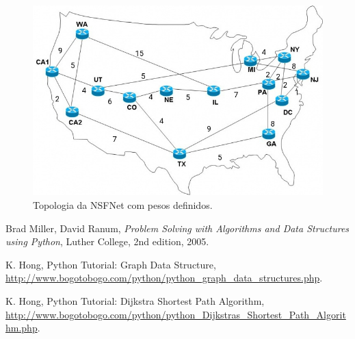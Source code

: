 \documentclass[a4paper,10pt]{article}
\begin{document}
  \begin{figure}[h!]
    \includegraphics[width=\linewidth]{nsfnet.jpg}
    \caption{Topologia da NSFNet com pesos definidos.}
    \label{fig:nsfnet}
  \end{figure}


\begin{thebibliography}{9}

  Brad Miller, David Ranum,
  \textit{Problem Solving with Algorithms and Data Structures using Python},
  Luther College,
  2nd edition,
  2005.
  
  K. Hong, Python Tutorial: Graph Data Structure,
  \url{http://www.bogotobogo.com/python/python_graph_data_structures.php}.
  
  K. Hong, Python Tutorial: Dijkstra Shortest Path Algorithm,
  \url{http://www.bogotobogo.com/python/python_Dijkstras_Shortest_Path_Algorithm.php}.

\end{thebibliography}
\end{document}
